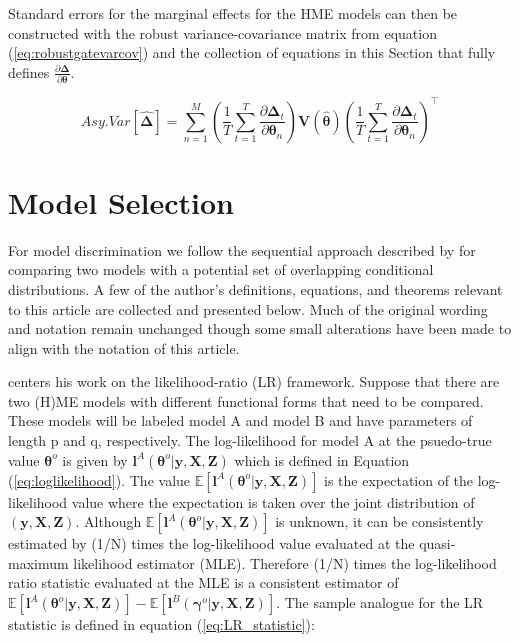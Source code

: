 \documentclass[12pt]{article}
\theoremstyle{definition}
\begin{document}
Standard errors for the marginal effects for the HME models can then be
constructed with the robust variance-covariance matrix from equation
(\ref{eq:robustgatevarcov}) and the collection of equations in this Section
that fully defines $\frac{\partial \boldsymbol{\Delta}}{\partial \boldsymbol{\theta}}$.


\begin{equation} \label{eq:std_errs_full_marginal_effects}
  Asy.Var \left[ \boldsymbol{ \hat{ \Delta } } \right] = \sum^{M}_{n=1}  \left( \frac{1}{T} \sum^{T}_{t=1} \frac{\partial \boldsymbol{\Delta}_{t}}{\partial \boldsymbol{\theta}_{n}} \right)     \boldsymbol{V}(\boldsymbol{\hat{\theta}})      \left( \frac{1}{T} \sum^{T}_{t=1} \frac{\partial \boldsymbol{\Delta}_{t}}{\partial \boldsymbol{\theta}_{n}} \right)^\top
\end{equation} 


\section{Model Selection} \label{sec:ModelSelection}

For model discrimination we follow the sequential approach described 
by \citet{Voung1989} for comparing two models with a potential set of overlapping
conditional distributions. A few of the author's definitions, equations, and theorems relevant 
to this article are collected and presented below. Much of the original wording
and notation remain unchanged though some small alterations have been made to align with the
notation of this article. 

\bigskip

\citet{Voung1989} centers his work on the likelihood-ratio (LR) framework.
Suppose that there are two (H)ME models with different functional forms that need
to be compared. These models will be labeled model A and model B and have parameters
of length p and q, respectively. The log-likelihood
for model A at the psuedo-true value $\boldsymbol{\theta}^{o}$ is given by
$\boldsymbol{l}^{A}(\boldsymbol{\theta}^{o}| \boldsymbol{y}, \boldsymbol{X}, \boldsymbol{Z})$
which is defined in Equation (\ref{eq:loglikelihood}). The value
$\mathbb{E} \left[ \boldsymbol{l}^{A}(\boldsymbol{\theta}^{o}| \boldsymbol{y}, \boldsymbol{X}, \boldsymbol{Z}) \right]$
is the expectation of the log-likelihood value where the expectation is taken over the
joint distribution of $(\boldsymbol{y}, \boldsymbol{X}, \boldsymbol{Z})$. Although
$\mathbb{E} \left[ \boldsymbol{l}^{A}(\boldsymbol{\theta}^{o}| \boldsymbol{y}, \boldsymbol{X}, \boldsymbol{Z}) \right]$
is unknown, it can be consistently estimated by (1/N) times the log-likelihood
value evaluated at the quasi-maximum likelihood estimator (MLE). Therefore (1/N) times
the log-likelihood ratio statistic evaluated at the MLE is a consistent estimator of 
$\mathbb{E} \left[ \boldsymbol{l}^{A}(\boldsymbol{\theta}^{o}| \boldsymbol{y}, \boldsymbol{X}, \boldsymbol{Z}) \right] - \mathbb{E} \left[ \boldsymbol{l}^{B}(\boldsymbol{\gamma}^{o}| \boldsymbol{y}, \boldsymbol{X}, \boldsymbol{Z}) \right]$.
The sample analogue for the LR statistic is defined in equation (\ref{eq:LR_statistic}):
\end{document}
